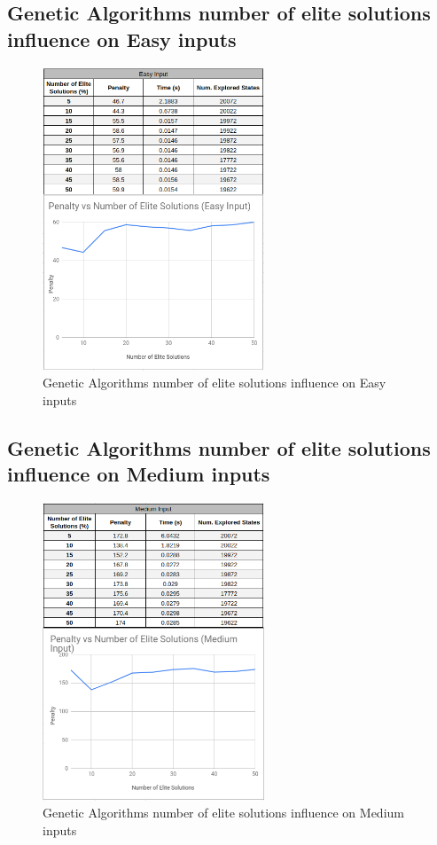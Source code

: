 \documentclass[conference]{IEEEtran}
\begin{document}
\subsection{Genetic Algorithms number of elite solutions influence on Easy inputs}

\begin{figure}[H]
    \centerline{\includegraphics[width=250px]{elite_easy.png}}
    \caption{Genetic Algorithms number of elite solutions influence on Easy inputs}
\end{figure}

\subsection{Genetic Algorithms number of elite solutions influence on Medium inputs}

\begin{figure}[H]
    \centerline{\includegraphics[width=250px]{elite_medium.png}}
    \caption{Genetic Algorithms number of elite solutions influence on Medium inputs}
\end{figure}
\end{document}

